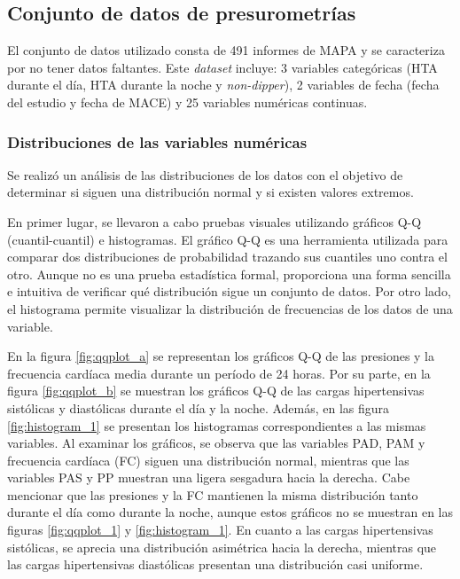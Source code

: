 \subsection{Conjunto de datos de presurometrías}
\label{sec:Conjunto1}

El conjunto de datos utilizado consta de 491 informes de MAPA y se caracteriza por no tener datos faltantes. 
Este \emph{dataset} incluye: 3 variables categóricas (HTA durante el día, HTA durante la noche y \emph{non-dipper}), 
2 variables de fecha (fecha del estudio y fecha de MACE) y 25 variables numéricas continuas.


\subsubsection{Distribuciones de las variables numéricas}
Se realizó un análisis de las distribuciones de los datos con el objetivo de determinar si siguen una distribución 
normal y si existen valores extremos. 

En primer lugar, se llevaron a cabo pruebas visuales utilizando gráficos Q-Q 
(cuantil-cuantil) e histogramas. El gráfico Q-Q es una herramienta utilizada para comparar dos distribuciones de 
probabilidad trazando sus cuantiles uno contra el otro. Aunque no es una prueba estadística formal, proporciona 
una forma sencilla e intuitiva de verificar qué distribución sigue un conjunto de datos. Por otro lado, el 
histograma permite visualizar la distribución de frecuencias de los datos de una variable. 

En la figura \ref{fig:qqplot_a} se representan los gráficos Q-Q de las presiones y la frecuencia cardíaca 
media durante un período de 24 horas. Por su parte, en la figura \ref{fig:qqplot_b} se muestran los 
gráficos Q-Q de las cargas hipertensivas sistólicas y diastólicas durante el día y la noche. Además, en 
las figura \ref{fig:histogram_1} se presentan los histogramas correspondientes a las mismas variables.
Al examinar los gráficos, se observa que las variables PAD, PAM y frecuencia cardíaca (FC) siguen una 
distribución normal, mientras que las variables PAS y PP muestran una ligera sesgadura hacia la derecha. 
Cabe mencionar que las presiones y la FC mantienen la misma distribución tanto durante el día como durante 
la noche, aunque estos gráficos no se muestran en las figuras \ref{fig:qqplot_1} y \ref{fig:histogram_1}.
En cuanto a las cargas hipertensivas sistólicas, se aprecia una distribución asimétrica hacia la derecha, 
mientras que las cargas hipertensivas diastólicas presentan una distribución casi uniforme.


